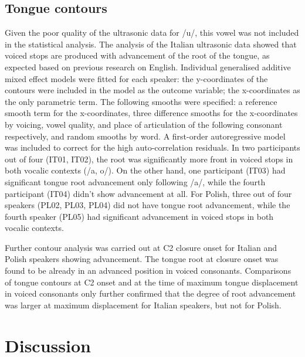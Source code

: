 \documentclass[authoryear, twocolumn]{elsarticle}
\begin{document}
\subsection{Tongue contours}\label{tongue-contours}

Given the poor quality of the ultrasonic data for /u/, this vowel was
not included in the statistical analysis. The analysis of the Italian
ultrasonic data showed that voiced stops are produced with advancement
of the root of the tongue, as expected based on previous research on
English. Individual generalised additive mixed effect models were fitted
for each speaker: the y-coordinates of the contours were included in the
model as the outcome variable; the x-coordinates as the only parametric
term. The following smooths were specified: a reference smooth term for
the x-coordinates, three difference smooths for the x-coordinates by
voicing, vowel quality, and place of articulation of the following
consonant respectively, and random smooths by word. A first-order
autoregressive model was included to correct for the high
auto-correlation residuals. In two participants out of four (IT01,
IT02), the root was significantly more front in voiced stops in both
vocalic contexts (/a, o/). On the other hand, one participant (IT03) had
significant tongue root advancement only following /a/, while the fourth
participant (IT04) didn't show advancement at all. For Polish, three out
of four speakers (PL02, PL03, PL04) did not have tongue root
advancement, while the fourth speaker (PL05) had significant advancement
in voiced stops in both vocalic contexts.

Further contour analysis was carried out at C2 closure onset for Italian
and Polish speakers showing advancement. The tongue root at closure
onset was found to be already in an advanced position in voiced
consonants. Comparisons of tongue contours at C2 onset and at the time
of maximum tongue displacement in voiced consonants only further
confirmed that the degree of root advancement was larger at maximum
displacement for Italian speakers, but not for Polish.

\section{Discussion}\label{discussion}
\end{document}
